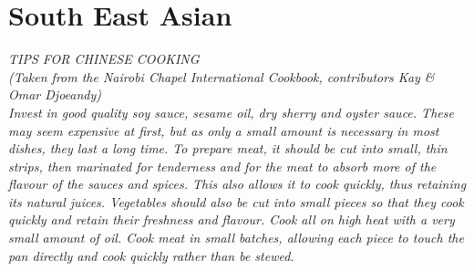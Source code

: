 \chapter{South East Asian}

\textit{TIPS FOR CHINESE COOKING\\
(Taken from the Nairobi Chapel International Cookbook, contributors Kay \& Omar Djoeandy)\\
Invest in good quality soy sauce, sesame oil, dry sherry and oyster sauce. These may seem expensive at first, but as only a small amount is necessary in most dishes, they last a long time.
To prepare meat, it should be cut into small, thin strips, then marinated for tenderness and for the meat to absorb more of the flavour of the sauces and spices. This also allows it to cook quickly, thus retaining its natural juices.
Vegetables should also be cut into small pieces so that they cook quickly and retain their freshness and flavour.
Cook all on high heat with a very small amount of oil. Cook meat in small batches, allowing each piece to touch the pan directly and cook quickly rather than be stewed.}

